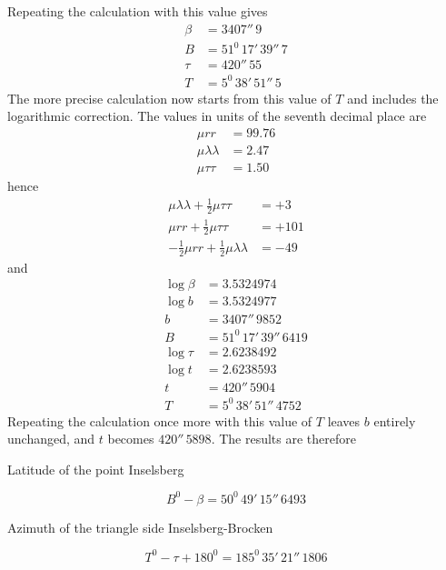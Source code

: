 %
Repeating the calculation with this value gives
\[
\begin{aligned}
\beta&=3407''\,9\\
B&=51^0\,17'\,39''\,7\\
\tau&=420''\,55\\
T&=5^0\,38'\,51''\,5
\end{aligned}
\]
The more precise calculation now starts from this value of \(T\) and includes the logarithmic correction. The values in units of the seventh decimal place are
\[
\begin{aligned}
\mu rr&=99.76\\
\mu\lambda\lambda&=2.47\\
\mu\tau\tau&=1.50
\end{aligned}
\]
hence
\[
\begin{aligned}
\mu\lambda\lambda+\tfrac12\mu\tau\tau&=+3\\
\mu rr+\tfrac12\mu\tau\tau&=+101\\
-\tfrac12\mu rr+\tfrac12\mu\lambda\lambda&=-49
\end{aligned}
\]
and
\[
\begin{aligned}
\log\beta&=3.5324974\\
\log b&=3.5324977\\
b&=3407''\,9852\\
B&=51^0\,17'\,39''\,6419\\
\log\tau&=2.6238492\\
\log t&=2.6238593\\
t&=420''\,5904\\
T&=5^0\,38'\,51''\,4752
\end{aligned}
\]
Repeating the calculation once more with this value of \(T\) leaves \(b\) entirely unchanged, and \(t\) becomes \(420''\,5898\). The results are therefore
\begin{center}Latitude of the point Inselsberg\end{center}
\[
B^0-\beta=50^0\,49'\,15''\,6493
\]
\begin{center}Azimuth of the triangle side Inselsberg-Brocken\end{center}
\[
T^0-\tau+180^0=185^0\,35'\,21''\,1806
\]
